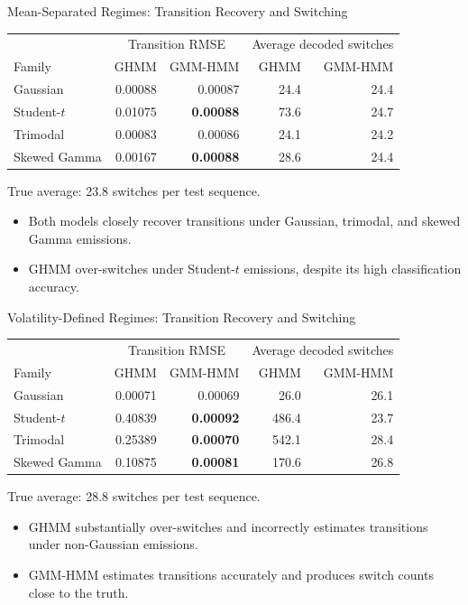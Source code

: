 \begin{frame}{Mean-Separated Regimes: Transition Recovery and Switching}
\small
\centering
\setlength{\tabcolsep}{7pt}
\begin{tabular}{lrrrr}
\toprule
& \multicolumn{2}{c}{Transition RMSE}
& \multicolumn{2}{c}{Average decoded switches} \\
Family & GHMM & GMM-HMM & GHMM & GMM-HMM \\
\midrule
Gaussian     & 0.00088 & 0.00087 & 24.4 & 24.4 \\
Student-$t$  & 0.01075 & \textbf{0.00088} & 73.6 & 24.7 \\
Trimodal     & 0.00083 & 0.00086 & 24.1 & 24.2 \\
Skewed Gamma & 0.00167 & \textbf{0.00088} & 28.6 & 24.4 \\
\bottomrule
\end{tabular}\par

\vspace{0.3cm}
\alert{True average: 23.8 switches per test sequence.}

\begin{itemize}
    \item Both models closely recover transitions under
    Gaussian, trimodal, and skewed Gamma emissions.
    \item GHMM over-switches under Student-$t$ emissions,
    despite its high classification accuracy.
\end{itemize}
\end{frame}


\begin{frame}{Volatility-Defined Regimes: Transition Recovery and Switching}
\small
\centering
\setlength{\tabcolsep}{7pt}
\begin{tabular}{lrrrr}
\toprule
& \multicolumn{2}{c}{Transition RMSE}
& \multicolumn{2}{c}{Average decoded switches} \\
Family & GHMM & GMM-HMM & GHMM & GMM-HMM \\
\midrule
Gaussian     & 0.00071 & 0.00069 & 26.0  & 26.1 \\
Student-$t$  & 0.40839 & \textbf{0.00092} & 486.4 & 23.7 \\
Trimodal     & 0.25389 & \textbf{0.00070} & 542.1 & 28.4 \\
Skewed Gamma & 0.10875 & \textbf{0.00081} & 170.6 & 26.8 \\
\bottomrule
\end{tabular}\par

\vspace{0.3cm}
\alert{True average: 28.8 switches per test sequence.}

\begin{itemize}
    \item GHMM substantially over-switches and incorrectly estimates transitions under non-Gaussian emissions.
    \item GMM-HMM estimates transitions accurately and produces
    switch counts close to the truth.
\end{itemize}
\end{frame}

